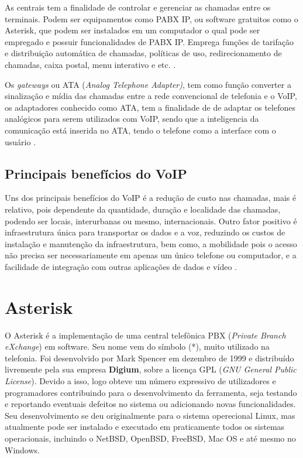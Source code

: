 As centrais tem a finalidade de controlar e gerenciar as chamadas entre os terminais. Podem ser equipamentos como PABX IP, ou software gratuitos como o Asterisk, que podem ser instalados em um computador o qual pode ser empregado e possuir funcionalidades de PABX IP. Emprega funções de tarifação e distribuição automática de chamadas, políticas de uso, redirecionamento de chamadas, caixa postal, menu interativo e etc. \cite{alexandrekeller2014}.

Os \textit{gateways} ou ATA (\textit{Analog Telephone Adapter)}, tem como função converter a sinalização e mídia das chamadas entre a rede convencional de telefonia e o VoIP, os adaptadores conhecido como ATA, tem a finalidade de de adaptar os telefones analógicos para serem utilizados com VoIP, sendo que a inteligencia da comunicação está inserida no ATA, tendo o telefone como a interface com o usuário \cite{eduardomaronasmonks2006}.


\subsection{Principais benefícios do VoIP}
Uns dos principais benefícios do VoIP é a redução de custo nas chamadas, mais é relativo, pois dependente da quantidade, duração e localidade das chamadas, podendo ser locais, interurbanas ou mesmo, internacionais. Outro fator positivo é infraestrutura única para transportar os dados e a voz,  reduzindo os custos de instalação e manutenção da infraestrutura, bem como, a mobilidade pois o acesso não precisa ser necessariamente em apenas
um único telefone ou computador, e a facilidade de integração com outras aplicações de dados e vídeo \cite{djaneelmajoanine2007}.

\section{Asterisk}
O Asterisk é a implementação de uma central telefônica PBX (\textit{Private Branch eXchange}) em software. Seu nome vem do símbolo (*), muito utilizado na telefonia. Foi desenvolvido por Mark Spencer em dezembro de 1999 e distribuído livremente pela sua empresa \textbf{Digium}, sobre a licença GPL (\textit{GNU General Public License}). Devido a isso, logo obteve um número expressivo de utilizadores e programadores contribuindo para o desenvolvimento da ferramenta, seja testando e reportando eventuais defeitos no sistema ou adicionando novas funcionalidades. Seu desenvolvimento se deu originalmente para o sistema operecional Linux, mas atualmente pode ser instalado e executado em praticamente todos os sistemas operacionais, incluindo o NetBSD, OpenBSD, FreeBSD, Mac OS e até mesmo no Windows. \cite{alexandrekeller2014}

